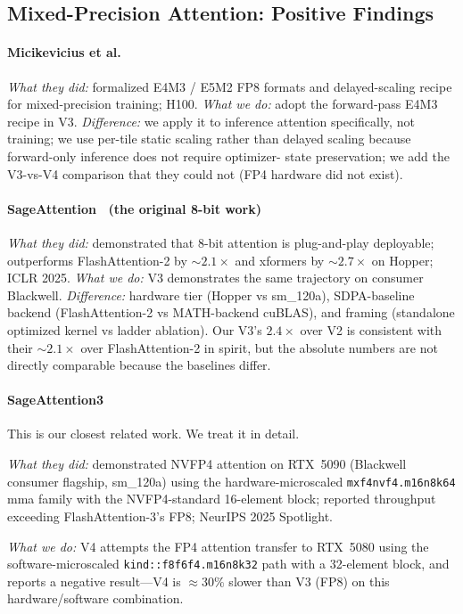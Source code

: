 \documentclass[conference]{IEEEtran}
\begin{document}
\subsection{Mixed-Precision Attention: Positive Findings}

\paragraph*{Micikevicius et al.~\cite{micikevicius2022fp8}}
\emph{What they did:} formalized E4M3 / E5M2 FP8 formats and
delayed-scaling recipe for mixed-precision training; H100.
\emph{What we do:} adopt the forward-pass E4M3 recipe in V3.
\emph{Difference:} we apply it to inference attention specifically,
not training; we use per-tile static scaling rather than delayed
scaling because forward-only inference does not require optimizer-
state preservation; we add the V3-vs-V4 comparison that they could
not (FP4 hardware did not exist).

\paragraph*{SageAttention~\cite{zhang2025sageattention} (the original 8-bit work)}
\emph{What they did:} demonstrated that 8-bit attention is
plug-and-play deployable; outperforms FlashAttention-2 by $\sim
2.1\times$ and xformers by $\sim 2.7\times$ on Hopper; ICLR 2025.
\emph{What we do:} V3 demonstrates the same trajectory on consumer
Blackwell. \emph{Difference:} hardware tier (Hopper vs sm\_120a),
SDPA-baseline backend (FlashAttention-2 vs MATH-backend cuBLAS), and
framing (standalone optimized kernel vs ladder ablation). Our V3's
$2.4\times$ over V2 is consistent with their $\sim 2.1\times$ over
FlashAttention-2 in spirit, but the absolute numbers are not
directly comparable because the baselines differ.

\paragraph*{SageAttention3~\cite{zhang2025sageattention3}}
This is our closest related work. We treat it in detail.

\emph{What they did:} demonstrated NVFP4 attention on RTX~5090
(Blackwell consumer flagship, sm\_120a) using the
hardware-microscaled \texttt{mxf4nvf4.m16n8k64} mma family with the
NVFP4-standard 16-element block; reported throughput exceeding
FlashAttention-3's FP8; NeurIPS 2025 Spotlight.

\emph{What we do:} V4 attempts the FP4 attention transfer to
RTX~5080 using the software-microscaled
\texttt{kind::f8f6f4.m16n8k32} path with a 32-element block, and
reports a negative result---V4 is $\approx 30\%$ slower than V3 (FP8)
on this hardware/software combination.
\end{document}
